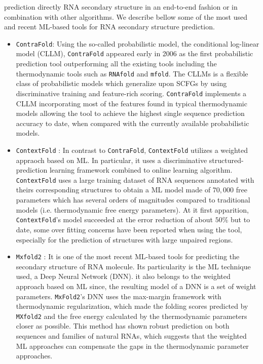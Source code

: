 prediction directly RNA secondary structure in an end-to-end fashion or in combination with other algorithms.  We describe bellow some of the most used and recent ML-based tools for RNA secondary structure prediction.
\begin{itemize}
	\item \texttt{ContraFold}\cite{do2006contrafold}: Using the so-called probabilistic model, the conditional log-linear model (CLLM), \texttt{ContraFold} appeared early in 2006 as the first  probabilistic prediction tool outperforming all the existing tools including the thermodynamic tools such as \texttt{RNAfold} and \texttt{mfold}. The CLLMs is a flexible class of probabilistic models which generalize upon SCFGs by using discriminative training and feature-rich scoring. \texttt{ContraFold} implements a CLLM incorporating most of the features found in typical thermodynamic models allowing the tool to achieve the highest single sequence prediction accuracy to date, when compared with the currently available probabilistic models.
	\item \texttt{ContextFold} \cite{zakov2011rich}: In contrast to \texttt{ContraFold}, \texttt{ContextFold} utilizes a weighted appraoch based on ML. In particular, it uses a discriminative structured-prediction learning framework combined to online learning algorithm. \texttt{ContextFold} uses a large training dataset of RNA sequences annotated with theirs corresponding structures to obtain a ML model made of $70,000$ free parameters which has several orders of magnitudes compared to traditional models (i.e. thermodynamic free energy parameters). At it first apparition, \texttt{ContextFold}'s model succeeded at the error reduction of about $50\%$ but to date, some over fitting concerns have been reported when using the tool, especially for the prediction of structures with large unpaired regions.  
	\item \texttt{Mxfold2}  \cite{sato2021rna}: It is one of the most recent ML-based tools for predicting the secondary structure of RNA molecule. Its particularity is the ML technique used, a Deep Neural Network (DNN). it also belongs to the weighted approach based on ML since, the resulting model of a DNN is a set of weight parameters. \texttt{MxFold2}'s DNN uses the max-margin framework with thermodynamic regularization, which made the folding scores predicted by \texttt{MXfold2} and the free energy calculated by the thermodynamic parameters closer as possible. This method has shown robust prediction on both sequences and families of natural RNAs, which suggests that the weighted ML approaches can compensate the gaps in the thermodynamic parameter approaches. 
\end{itemize}


